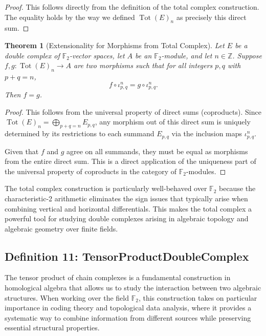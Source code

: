 \documentclass[11pt]{article}
\theoremstyle{plain}
\newtheorem*{theorem}{Theorem}
\theoremstyle{definition}
\theoremstyle{remark}
\begin{document}
\begin{proof}
This follows directly from the definition of the total complex construction. The equality holds by the way we defined $\operatorname{Tot}(E)_n$ as precisely this direct sum.
\end{proof}

\begin{theorem}[Extensionality for Morphisms from Total Complex]
Let $E$ be a double complex of $\mathbb{F}_2$-vector spaces, let $A$ be an $\mathbb{F}_2$-module, and let $n \in \mathbb{Z}$. Suppose $f, g \colon \operatorname{Tot}(E)_n \to A$ are two morphisms such that for all integers $p, q$ with $p + q = n$,
\[
  f \circ \iota_{p,q}^n = g \circ \iota_{p,q}^n.
\]
Then $f = g$.
\end{theorem}

\begin{proof}
This follows from the universal property of direct sums (coproducts). Since $\operatorname{Tot}(E)_n = \bigoplus_{p+q=n} E_{p,q}$, any morphism out of this direct sum is uniquely determined by its restrictions to each summand $E_{p,q}$ via the inclusion maps $\iota_{p,q}^n$. 

Given that $f$ and $g$ agree on all summands, they must be equal as morphisms from the entire direct sum. This is a direct application of the uniqueness part of the universal property of coproducts in the category of $\mathbb{F}_2$-modules.
\end{proof}

The total complex construction is particularly well-behaved over $\mathbb{F}_2$ because the characteristic-2 arithmetic eliminates the sign issues that typically arise when combining vertical and horizontal differentials. This makes the total complex a powerful tool for studying double complexes arising in algebraic topology and algebraic geometry over finite fields.

\vspace{1em}

\subsection{Definition 11: TensorProductDoubleComplex}

The tensor product of chain complexes is a fundamental construction in homological algebra that allows us to study the interaction between two algebraic structures. When working over the field $\mathbb{F}_2$, this construction takes on particular importance in coding theory and topological data analysis, where it provides a systematic way to combine information from different sources while preserving essential structural properties.
\end{document}

